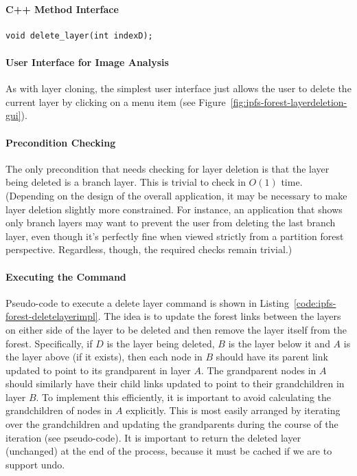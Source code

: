 \paragraph{C++ Method Interface}

\begin{lstlisting}[style=Prototype]
void delete_layer(int indexD);
\end{lstlisting}

\paragraph{User Interface for Image Analysis}

As with layer cloning, the simplest user interface just allows the user to delete the current layer by clicking on a menu item (see Figure~\ref{fig:ipfs-forest-layerdeletion-gui}).


\paragraph{Precondition Checking}

The only precondition that needs checking for layer deletion is that the layer being deleted is a branch layer. This is trivial to check in $O(1)$ time. (Depending on the design of the overall application, it may be necessary to make layer deletion slightly more constrained. For instance, an application that shows only branch layers may want to prevent the user from deleting the last branch layer, even though it's perfectly fine when viewed strictly from a partition forest perspective. Regardless, though, the required checks remain trivial.)

\paragraph{Executing the Command}

Pseudo-code to execute a delete layer command is shown in Listing~\ref{code:ipfs-forest-deletelayerimpl}. The idea is to update the forest links between the layers on either side of the layer to be deleted and then remove the layer itself from the forest. Specifically, if $D$ is the layer being deleted, $B$ is the layer below it and $A$ is the layer above (if it exists), then each node in $B$ should have its parent link updated to point to its grandparent in layer $A$. The grandparent nodes in $A$ should similarly have their child links updated to point to their grandchildren in layer $B$. To implement this efficiently, it is important to avoid calculating the grandchildren of nodes in $A$ explicitly. This is most easily arranged by iterating over the grandchildren and updating the grandparents during the course of the iteration (see pseudo-code). It is important to return the deleted layer (unchanged) at the end of the process, because it must be cached if we are to support undo.

